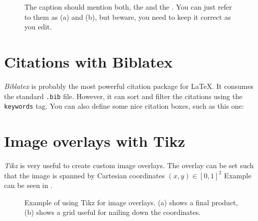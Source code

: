 \begin{figure}[!h]
  \centering
  \caption{The caption should mention both, the  and the . You can just refer to them as (a) and (b), but beware, you need to keep it correct as you edit.}
  \label{fig:uavs}
\end{figure}

\section{Citations with Biblatex}

\emph{Biblatex} is probably the most powerful citation package for LaTeX.
It consumes the standard \texttt{.bib} file. However, it can sort and filter the citations using the \texttt{keywords} tag.
You can also define some nice citation boxes, such as this one:

\section{Image overlays with Tikz}

\emph{Tikz} is very useful to create custom image overlays.
The overlay can be set such that the image is spanned by Cartesian coordinates $\left(x, y\right) \in \left[0, 1\right]^2$
Example can be seen in .

\begin{figure}[!h]

  \centering

  

  \caption{Example of using Tikz for image overlays. (a) shows a final product, (b) shows a grid useful for nailing down the coordinates.}
  \label{fig:tikz_overlay}

\end{figure}
